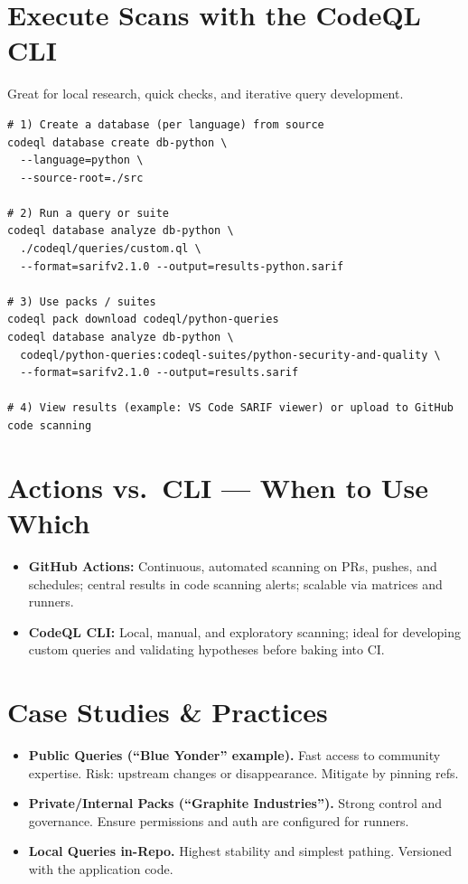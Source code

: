\documentclass[11pt,a4paper]{article}
\begin{document}
\section{Execute Scans with the CodeQL CLI}
Great for local research, quick checks, and iterative query development.
\begin{verbatim}
# 1) Create a database (per language) from source
codeql database create db-python \
  --language=python \
  --source-root=./src

# 2) Run a query or suite
codeql database analyze db-python \
  ./codeql/queries/custom.ql \
  --format=sarifv2.1.0 --output=results-python.sarif

# 3) Use packs / suites
codeql pack download codeql/python-queries
codeql database analyze db-python \
  codeql/python-queries:codeql-suites/python-security-and-quality \
  --format=sarifv2.1.0 --output=results.sarif

# 4) View results (example: VS Code SARIF viewer) or upload to GitHub code scanning
\end{verbatim}

\section{Actions vs.\ CLI --- When to Use Which}
\begin{itemize}
  \item \textbf{GitHub Actions:} Continuous, automated scanning on PRs, pushes, and schedules; central results in code scanning alerts; scalable via matrices and runners.
  \item \textbf{CodeQL CLI:} Local, manual, and exploratory scanning; ideal for developing custom queries and validating hypotheses before baking into CI.
\end{itemize}

\section{Case Studies \& Practices}
\begin{itemize}
  \item \textbf{Public Queries (``Blue Yonder'' example).} Fast access to community expertise. Risk: upstream changes or disappearance. Mitigate by pinning refs.
  \item \textbf{Private/Internal Packs (``Graphite Industries'').} Strong control and governance. Ensure permissions and auth are configured for runners.
  \item \textbf{Local Queries in-Repo.} Highest stability and simplest pathing. Versioned with the application code.
\end{itemize}
\end{document}
